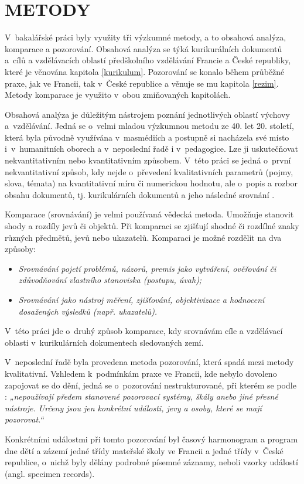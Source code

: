 
\chapter{METODY}
\label{metody}

V~bakalářské práci byly využity tři výzkumné metody, a to obsahová analýza, komparace a pozorování. Obsahová analýza se týká kurikurálních dokumentů a cílů a vzdělávacích oblastí předškolního vzdělávání Francie a České republiky, které je věnována kapitola \ref{kurikulum}. Pozorování se konalo během průběžné praxe, jak ve Francii, tak v České republice a věnuje se mu kapitola \ref{rezim}. Metody komparace je využito v~obou zmiňovaných kapitolách. 

Obsahová analýza je důležitým nástrojem poznání jednotlivých oblastí výchovy a vzdělávání. Jedná se o~velmi mladou výzkumnou metodu ze 40. let 20. století, která byla původně využívána v masmédiích a postupně si nacházela své místo i v humanitních oborech a v neposlední řadě i v pedagogice. Lze ji uskutečňovat nekvantitativním nebo kvantitativním způsobem. V této práci se jedná o~první nekvantitativní způsob, kdy nejde o~převedení kvalitativních parametrů (pojmy, slova, témata) na kvantitativní míru či numerickou hodnotu, ale o~popis a rozbor obsahu dokumentů, tj. kurikulárních dokumentů a jeho následné srovnání \citep{Gavora08}.

Komparace (srovnávání) je velmi používaná vědecká metoda. Umožňuje stanovit shody a rozdíly jevů či objektů. Při komparaci se zjišťují shodné či rozdílné znaky různých předmětů, jevů nebo ukazatelů. 
Komparaci je možné rozdělit na dva způsoby:
\begin{itemize}
\item []\textit{Srovnávání pojetí problémů, názorů, premis jako vytváření, ověřování či zdůvodňování vlastního stanoviska (postupu, úvah);}
\item []\textit{Srovnávání jako nástroj měření, zjišťování, objektivizace a hodnocení dosažených výsledků (např. ukazatelů).} \citep[s.~19]{Siroky}
\end{itemize}
V~této práci jde o~druhý způsob komparace, kdy srovnávám cíle a vzdělávací oblasti v~kurikulárních dokumentech sledovaných zemí.  

V~neposlední řadě byla provedena metoda pozorování, která spadá mezi metody kvalitativní. Vzhledem k podmínkám praxe ve Francii, kde nebylo dovoleno zapojovat se do dění, jedná se o~pozorování nestrukturované, při kterém se podle \citet[s.~17]{Gavora96}: \textit{„nepoužívají předem stanovené pozorovací systémy, škály anebo jiné přesné nástroje. Určeny jsou jen konkrétní události, jevy a osoby, které se mají pozorovat.“} 

Konkrétními událostmi při tomto pozorování byl časový harmonogram a program dne dětí a zázemí jedné třídy mateřské školy ve Francii a jedné třídy v České republice, o~nichž byly dělány podrobné písemné záznamy, neboli vzorky událostí (angl. specimen records). 
